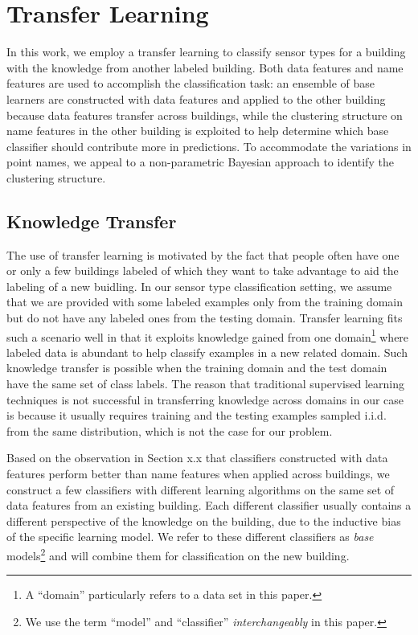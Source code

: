 \section{Transfer Learning}
In this work, we employ a transfer learning to classify sensor types for a building with the knowledge from another labeled building. Both data features and name features are used to accomplish the classification task: an ensemble of base learners are constructed with data features and applied to the other building because data features transfer across buildings, while the clustering structure on name features in the other building is exploited to help determine which base classifier should contribute more in predictions. 
To accommodate the variations in point names, we appeal to a non-parametric Bayesian approach to identify the clustering structure.


\subsection{Knowledge Transfer}
The use of transfer learning is motivated by the fact that people often have one or only a few buildings labeled of which they want to take advantage to aid the labeling of a new buidling.
In our sensor type classification setting, we assume that we are provided with some labeled examples only from the training domain but do not have any labeled ones from the testing domain. 
Transfer learning fits such a scenario well in that it exploits knowledge gained from one domain\footnote{A ``domain'' particularly refers to a data set  in this paper.} where labeled data is abundant to help classify examples in a new related domain. 
Such knowledge transfer is possible when the training domain and the test domain have the same set of class labels. 
The reason that traditional supervised learning techniques is not successful in transferring knowledge across domains in our case is because it usually requires training and the testing examples sampled i.i.d. from the same distribution, which is not the case for our problem.

Based on the observation in Section x.x that classifiers constructed with data features perform better than name features when applied across buildings, we construct a few classifiers with different learning algorithms on the same set of data features from an existing building. 
Each different classifier usually contains a different perspective of the knowledge on the building, due to the inductive bias of the specific learning model. 
We refer to these different classifiers as {\it base} models\footnote{We use the term ``model'' and ``classifier'' {\it interchangeably} in this paper.} and will combine them for classification on the new building.

